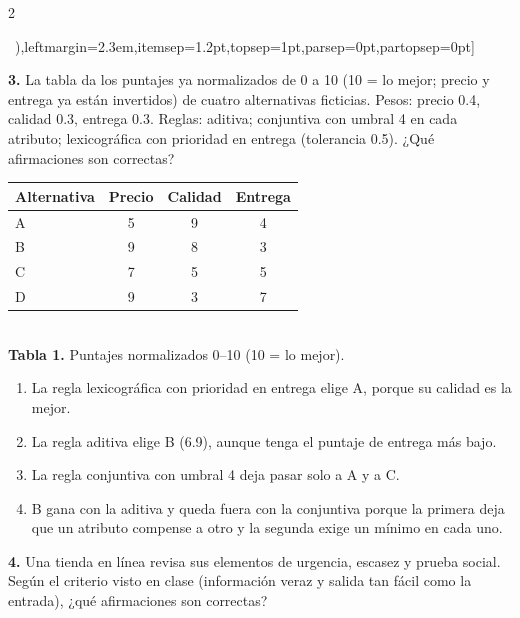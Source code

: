\documentclass[10pt,letterpaper]{article}
\newcommand{\cas}{\framebox[1.0em]{\rule{0pt}{1.05ex}}}
\begin{document}
\begin{multicols}{2}
\begin{minipage}[t]{\columnwidth}
\begin{enumerate}[label=\cas\ \alph*),leftmargin=2.3em,itemsep=1.2pt,topsep=1pt,parsep=0pt,partopsep=0pt]
\end{enumerate}\end{minipage}\par\vspace{3pt}
\begin{minipage}[t]{\columnwidth}\noindent\textbf{3.} La tabla da los puntajes ya normalizados de 0 a 10 (10 = lo mejor; precio y entrega ya están invertidos) de cuatro alternativas ficticias. Pesos: precio 0.4, calidad 0.3, entrega 0.3. Reglas: aditiva; conjuntiva con umbral 4 en cada atributo; lexicográfica con prioridad en entrega (tolerancia 0.5). ¿Qué afirmaciones son correctas?
\begin{center}{\scriptsize\renewcommand{\arraystretch}{1.05}\begin{tabular}{@{}lccc@{}}\toprule
Alternativa & Precio & Calidad & Entrega\\\midrule
A & 5 & 9 & 4\\ B & 9 & 8 & 3\\ C & 7 & 5 & 5\\ D & 9 & 3 & 7\\\bottomrule\end{tabular}}\\[1pt]{\tiny\textbf{Tabla 1.} Puntajes normalizados 0--10 (10 = lo mejor).}\end{center}
\vspace{1pt}\begin{enumerate}[label=\cas\ \alph*),leftmargin=2.3em,itemsep=1.2pt,topsep=1pt,parsep=0pt,partopsep=0pt]
\item La regla lexicográfica con prioridad en entrega elige A, porque su calidad es la mejor.
\item La regla aditiva elige B (6.9), aunque tenga el puntaje de entrega más bajo.
\item La regla conjuntiva con umbral 4 deja pasar solo a A y a C.
\item B gana con la aditiva y queda fuera con la conjuntiva porque la primera deja que un atributo compense a otro y la segunda exige un mínimo en cada uno.
\end{enumerate}\end{minipage}\par\vspace{3pt}
\begin{minipage}[t]{\columnwidth}\noindent\textbf{4.} Una tienda en línea revisa sus elementos de urgencia, escasez y prueba social. Según el criterio visto en clase (información veraz y salida tan fácil como la entrada), ¿qué afirmaciones son correctas?

\end{minipage}
\end{multicols}
\end{document}
